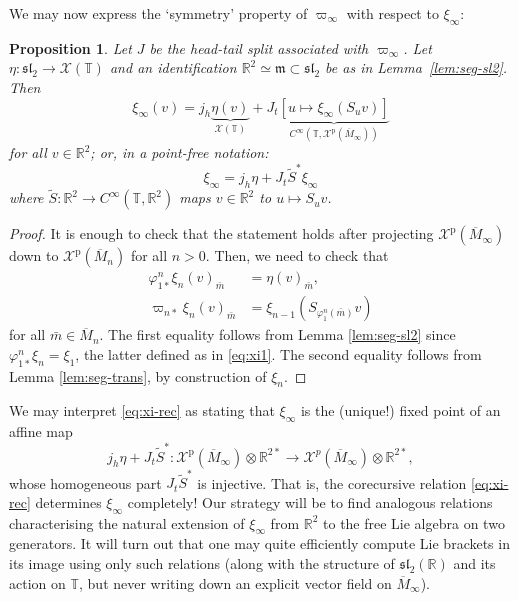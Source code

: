 \documentclass{article}
\def\fsl{\mathfrak{sl}}
\def\fm{\mathfrak{m}}
\def\RR{\mathbb{R}}
\def\TT{\mathbb{T}}
\def\XX{\mathcal{X}}
\def\p{\mathrm{p}}
\newtheorem{prop}{Proposition}
\theoremstyle{definition}
\begin{document}
We
may now express the `symmetry' property of $\varpi_\infty$ with respect to $\xi_\infty$:
\begin{prop}\label{prop:xi-rec}
        Let $J$ be the head-tail split associated
        with $\varpi_\infty$. Let $\eta : \fsl_2 \to \XX(\TT)$
        and an identification $\RR^2 \simeq \fm \subset \fsl_2$ be as in Lemma~\ref{lem:seg-sl2}.
        Then 
        $$
        \xi_\infty(v) = j_h \underbrace{ \eta(v) }_{\XX(\TT)} 
        + J_t\underbrace{
        \left[ u \mapsto \xi_\infty(S_u v) \right]
        }_{C^\infty(\TT, \XX^\p(\overline M_\infty))} 
        $$
        for all $v \in \RR^2$; or, in a point-free notation:
\begin{equation}\label{eq:xi-rec}
         \xi_\infty = j_h\eta + J_t \tilde S^* \xi_\infty
\end{equation}
        where $\tilde S  : \RR^2 \to C^\infty(\TT, \RR^2)$
        maps $v \in \RR^2$ to $u\mapsto S_uv$.
\end{prop}
\begin{proof}
        It is enough to check that the statement holds after
        projecting $\XX^\p(\overline M_\infty)$ down to $\XX^\p(\overline M_n)$
        for all $n>0$. Then, we need to check that
        \begin{align*}
                \varphi^n_{1*}\xi_n(v)_{\bar m} &= \eta(v)_{\bar m},\\
                \varpi_{n*}\xi_n(v)_{\bar m} &= \xi_{n-1}(S_{\varphi^n_1(\bar m)} v)
        \end{align*}
        for all $\bar m \in \overline M_n$. The first equality follows from Lemma \ref{lem:seg-sl2}
        since $\varphi^n_{1*}\xi_n = \xi_1$, the latter defined as in \eqref{eq:xi1}. The
        second equality follows from Lemma \ref{lem:seg-trans}, by construction of $\xi_n$.
\end{proof}

We may interpret \eqref{eq:xi-rec} as stating that $\xi_\infty$ is the (unique!) fixed point of an affine
map
$$
 j_h\eta + J_t\tilde S^* :
\XX^\p(\overline M_\infty)\otimes\RR^{2*} \to
\XX^p(\overline M_\infty)\otimes\RR^{2*}, $$
whose homogeneous part $J_t \tilde S^*$
is injective. That is, the corecursive relation \eqref{eq:xi-rec} determines
$\xi_\infty$ completely!
Our strategy will be to find analogous relations
characterising the natural extension of $\xi_\infty$
from $\RR^2$ to the free Lie algebra on two generators.
It will turn out that one may quite efficiently compute Lie brackets in its image using only such 
relations (along with the structure of $\fsl_2(\RR)$ and its action on $\TT$, but
never writing down an explicit vector field on $\overline M_\infty$).
\end{document}
